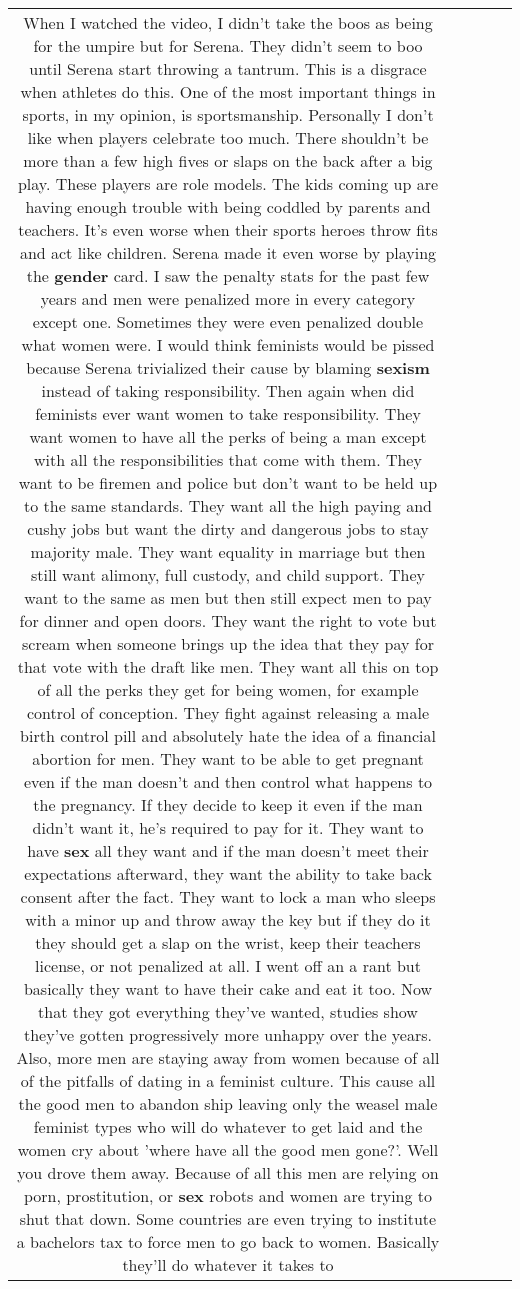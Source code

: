 \documentclass[11pt]{article}
\newlength\mylength
\begin{document}
\begin{center}
\begin{longtable}{|C{.65\mylength}|C{.30\mylength}|C{.12\mylength}|C{.12\mylength}|C{.12\mylength}|}
  \small When I watched the video, I didn't take the boos as being for the umpire but for Serena. They didn't seem to boo until Serena start throwing a tantrum. This is a disgrace when athletes do this. One of the most important things in sports, in my opinion, is sportsmanship. Personally I don't like when players celebrate too much. There shouldn't be more than a few high fives or slaps on the back after a big play. These players are role models. The kids coming up are having enough trouble with being coddled by parents and teachers. It's even worse when their sports heroes throw fits and act like children. Serena made it even worse by playing the \textbf{gender} card. I saw the penalty stats for the past few years and men were penalized more in every category except one. Sometimes they were even penalized double what women were. I would think feminists would be pissed because Serena trivialized their cause by blaming \textbf{sexism} instead of taking responsibility. Then again when did feminists ever want women to take responsibility. They want women to have all the perks of being a man except with all the responsibilities that come with them. They want to be firemen and police but don't want to be held up to the same standards. They want all the high paying and cushy jobs but want the dirty and dangerous jobs to stay majority male. They want equality in marriage but then still want alimony, full custody, and child support. They want to the same as men but then still expect men to pay for dinner and open doors. They want the right to vote but scream when someone brings up the idea that they pay for that vote with the draft like men. They want all this on top of all the perks they get for being women, for example control of conception. They fight against releasing a male birth control pill and absolutely hate the idea of a financial abortion for men. They want to be able to get pregnant even if the man doesn't and then control what happens to the pregnancy. If they decide to keep it even if the man didn't want it, he's required to pay for it. They want to have \textbf{sex} all they want and if the man doesn't meet their expectations afterward, they want the ability to take back consent after the fact. They want to lock a man who sleeps with a minor up and throw away the key but if they do it they should get a slap on the wrist, keep their teachers license, or not penalized at all. I went off an a rant but basically they want to have their cake and eat it too. Now that they got everything they've wanted, studies show they've gotten progressively more unhappy over the years. Also, more men are staying away from women because of all of the pitfalls of dating in a feminist culture. This cause all the good men to abandon ship leaving only the weasel male feminist types who will do whatever to get laid and the women cry about 'where have all the good men gone?'. Well you drove them away. Because of all this men are relying on porn, prostitution, or \textbf{sex} robots and women are trying to shut that down. Some countries are even trying to institute a bachelors tax to force men to go back to women. Basically they'll do whatever it takes to 
\end{longtable}
\end{center}
\end{document}
